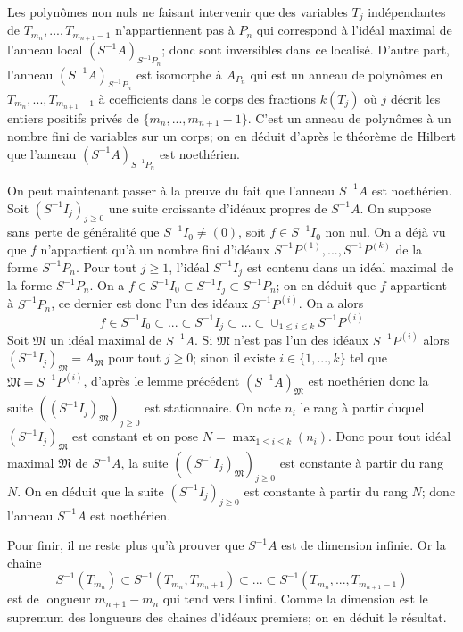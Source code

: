 \documentclass{article}
\begin{document}
Les polynômes non nuls ne faisant intervenir que des variables $T_j$ indépendantes de $T_{m_n}, ..., T_{m_{n+1}-1}$ n'appartiennent pas à $P_n$ qui correspond à l'idéal maximal de l'anneau local $(S^{-1}A)_{S^{-1}P_n}$; donc sont inversibles dans ce localisé. D'autre part, l'anneau $(S^{-1}A)_{S^{-1}P_n}$ est isomorphe à $A_{P_n}$ qui est un anneau de polynômes en $T_{m_n}, ..., T_{m_{n+1}-1}$ à coefficients dans le corps des fractions $k(T_j)$ où $j$ décrit les entiers positifs privés de $\{m_n, ..., m_{n+1}-1\}$. C'est un anneau de polynômes à un nombre fini de variables sur un corps; on en déduit d'après le théorème de Hilbert que l'anneau $(S^{-1}A)_{S^{-1}P_n}$ est noethérien.

On peut maintenant passer à la preuve du fait que l'anneau $S^{-1}A$ est noethérien. Soit $(S^{-1}I_j)_{j \geq 0}$ une suite croissante d'idéaux propres de $S^{-1}A$. On suppose sans perte de généralité que $S^{-1}I_0 \neq (0)$, soit $f \in S^{-1}I_0$ non nul. On a déjà vu que $f$ n'appartient qu'à un nombre fini d'idéaux $S^{-1}P^{(1)}, ..., S^{-1}P^{(k)}$ de la forme $S^{-1}P_n$. Pour tout $j \geq 1$, l'idéal $S^{-1}I_j$ est contenu dans un idéal maximal de la forme $S^{-1}P_n$. On a $f \in S^{-1}I_0 \subset S^{-1}I_j \subset S^{-1}P_n$; on en déduit que $f$ appartient à $S^{-1}P_n$, ce dernier est donc l'un des idéaux $S^{-1}P^{(i)}$.
On a alors
\begin{equation*}
f \in S^{-1}I_0 \subset ... \subset S^{-1}I_j \subset ... \subset \cup_{1 \leq i \leq k}S^{-1}P^{(i)}
\end{equation*}
Soit $\mathfrak{M}$ un idéal maximal de $S^{-1}A$. Si $\mathfrak{M}$ n'est pas l'un des idéaux $S^{-1}P^{(i)}$ alors $(S^{-1}I_j)_\mathfrak{M} = A_\mathfrak{M}$ pour tout $j \geq 0$; sinon il existe $i \in \{1, ..., k\}$ tel que $\mathfrak{M} = S^{-1}P^{(i)}$, d'après le lemme précédent $(S^{-1}A)_\mathfrak{M}$ est noethérien donc la suite $( (S^{-1}I_j)_\mathfrak{M} )_{j \geq 0}$ est stationnaire. On note $n_i$ le rang à partir duquel $(S^{-1}I_j)_\mathfrak{M}$ est constant et on pose $N = \max_{1 \leq i \leq k}(n_i)$. Donc pour tout idéal maximal $\mathfrak{M}$ de $S^{-1}A$, la suite $( (S^{-1}I_j)_\mathfrak{M} )_{j \geq 0}$ est constante à partir du rang $N$. On en déduit que la suite $(S^{-1}I_j)_{j \geq 0}$ est constante à partir du rang $N$; donc l'anneau $S^{-1}A$ est noethérien.

Pour finir, il ne reste plus qu'à prouver que $S^{-1}A$ est de dimension infinie. Or la chaine
\begin{equation*}
S^{-1}(T_{m_n}) \subset S^{-1}(T_{m_n}, T_{m_n+1}) \subset ... \subset S^{-1}(T_{m_n}, ..., T_{m_{n+1}-1})
\end{equation*}
est de longueur $m_{n+1} - m_n$ qui tend vers l'infini. Comme la dimension est le supremum des longueurs des chaines d'idéaux premiers; on en déduit le résultat.
\end{document}
